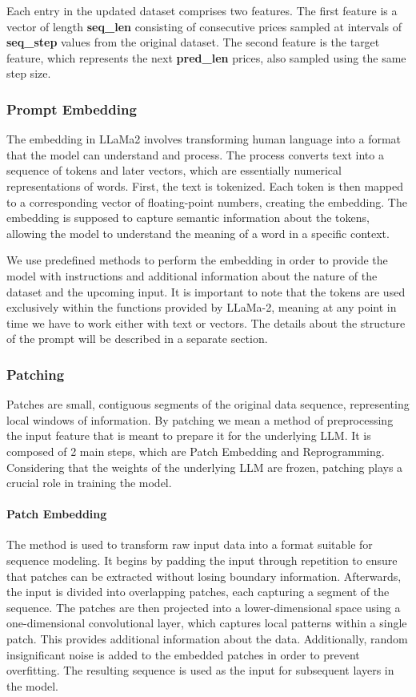Each entry in the updated dataset comprises two features. The first feature is a vector of length \textbf{seq\_len} consisting of consecutive prices sampled at intervals of \textbf{seq\_step} values from the original dataset. The second feature is the target feature, which represents the next \textbf{pred\_len} prices, also sampled using the same step size.

\subsubsection*{Prompt Embedding}
The embedding in LLaMa2 involves transforming human language into a format that the model can understand and process. The process converts text into a sequence of tokens and later vectors, which are essentially numerical representations of words. First, the text is tokenized. Each token is then mapped to a corresponding vector of floating-point numbers, creating the embedding. The embedding is supposed to capture semantic information about the tokens, allowing the model to understand the meaning of a word in a specific context.

We use predefined methods to perform the embedding in order to provide the model with instructions and additional information about the nature of the dataset and the upcoming input. It is important to note that the tokens are used exclusively within the functions provided by LLaMa-2, meaning at any point in time we have to work either with text or vectors.  The details about the structure of the prompt will be described in a separate section.
\subsubsection*{Patching}
Patches are small, contiguous segments of the original data sequence, representing local windows of information. By patching we mean a method of preprocessing the input feature that is meant to prepare it for the underlying LLM. It is composed of 2 main steps, which are Patch Embedding and Reprogramming. Considering that the weights of the underlying LLM are frozen, patching plays a crucial role in training the model.

\paragraph{Patch Embedding}
The method is used to transform raw input data into a format suitable for sequence modeling. It begins by padding the input through repetition to ensure that patches can be extracted without losing boundary information. Afterwards, the input is divided into overlapping patches, each capturing a segment of the sequence. The patches are then projected into a lower-dimensional space using a one-dimensional convolutional layer, which captures local patterns within a single patch. This provides additional information about the data. Additionally, random insignificant noise is added to the embedded patches in order to prevent overfitting. The resulting sequence is used as the input for subsequent layers in the model.

